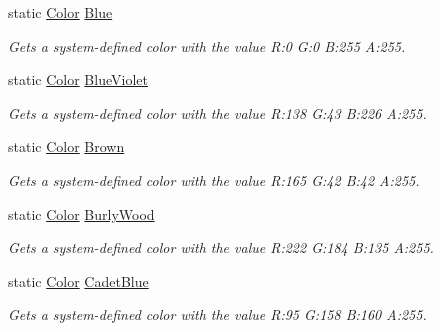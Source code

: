 \begin{DoxyCompactItemize}
static \hyperlink{struct_microsoft_1_1_xna_1_1_framework_1_1_color}{Color} \hyperlink{struct_microsoft_1_1_xna_1_1_framework_1_1_color_aecbccaea65e06cd1dff26b274906d305}{Blue}
\begin{DoxyCompactList}\small\item\em Gets a system-\/defined color with the value R\+:0 G\+:0 B\+:255 A\+:255.\end{DoxyCompactList}\item 
static \hyperlink{struct_microsoft_1_1_xna_1_1_framework_1_1_color}{Color} \hyperlink{struct_microsoft_1_1_xna_1_1_framework_1_1_color_a2fdcf941c1df9fe8f305f50887c867c7}{Blue\+Violet}
\begin{DoxyCompactList}\small\item\em Gets a system-\/defined color with the value R\+:138 G\+:43 B\+:226 A\+:255.\end{DoxyCompactList}\item 
static \hyperlink{struct_microsoft_1_1_xna_1_1_framework_1_1_color}{Color} \hyperlink{struct_microsoft_1_1_xna_1_1_framework_1_1_color_ad57ebb2d75ec7fd1b95636a274e0c0a9}{Brown}
\begin{DoxyCompactList}\small\item\em Gets a system-\/defined color with the value R\+:165 G\+:42 B\+:42 A\+:255.\end{DoxyCompactList}\item 
static \hyperlink{struct_microsoft_1_1_xna_1_1_framework_1_1_color}{Color} \hyperlink{struct_microsoft_1_1_xna_1_1_framework_1_1_color_ae51125f0ccec0be6ee3497aa3e7c48cc}{Burly\+Wood}
\begin{DoxyCompactList}\small\item\em Gets a system-\/defined color with the value R\+:222 G\+:184 B\+:135 A\+:255.\end{DoxyCompactList}\item 
static \hyperlink{struct_microsoft_1_1_xna_1_1_framework_1_1_color}{Color} \hyperlink{struct_microsoft_1_1_xna_1_1_framework_1_1_color_a30a832403da488b87546794f0fdaddae}{Cadet\+Blue}
\begin{DoxyCompactList}\small\item\em Gets a system-\/defined color with the value R\+:95 G\+:158 B\+:160 A\+:255.\end{DoxyCompactList}\item 

\end{DoxyCompactItemize}
